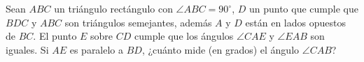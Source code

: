 Sean $ABC$ un triángulo rectángulo con $\angle ABC = 90^\circ$, $D$ un punto que cumple que $BDC$ y $ABC$ son triángulos semejantes, además $A$ y $D$ están en lados opuestos de $BC$. El punto $E$ sobre $CD$ cumple que los ángulos $\angle CAE$ y $\angle EAB$ son iguales. Si $AE$ es paralelo a $BD$, ¿cuánto mide (en grados) el ángulo $\angle CAB$?